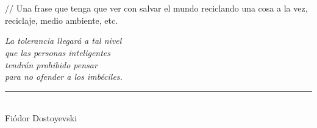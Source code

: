 \chapter*{} %

// Una frase que tenga que ver con salvar el mundo reciclando una cosa a la vez, reciclaje, medio ambiente, etc.

\begin{flushright}
    \textit{La tolerancia llegará a tal nivel \\ que las personas inteligentes \\ tendrán prohibido pensar \\ para no ofender a los imbéciles. 
    } \\
    \rule{5cm}{0.5pt} 
    \\ Fiódor Dostoyevski
\end{flushright}

